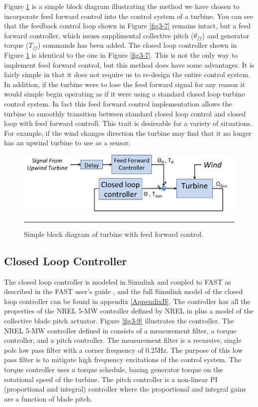 Figure \ref{fig3-8} is a simple block diagram illustrating the method we have chosen  to incorporate feed forward control into the control system of a turbine. You can see that the feedback control loop shown in Figure \ref{fig3-7} remains intact, but a feed forward controller, which issues supplimental collective pitch ($\theta_{ff}$) and generator torque ($T_{ff}$) commands has been added. The closed loop controller shown in Figure \ref{fig3-8} is identical to the one in Figure \ref{fig3-7}. This is not the only way to implement feed forward control, but this method does have some advantages. It is fairly simple in that it does not require us to re-design the entire control system. In addition, if the turbine were to lose the feed forward signal for any reason it would simple begin operating as if it were using a standard closed loop turbine control system. In fact this feed forward control implementation allows the turbine to smoothly transition between standard closed loop control and closed loop with feed forward controll. This trait is desireable for a variety of situations. For example, if the wind changes direction the turbine may find that it no longer has an upwind turbine to use as a sensor.

 \begin{figure}[htbp]
	\centering
		\includegraphics[width=\linewidth]{Figures/ch3Figures/fig3-8.png}
		\rule{35em}{0.5pt}
	\caption{Simple block diagram of turbine with feed forward control.}
	\label{fig3-8}
\end{figure}

\subsection{Closed Loop Controller}

The closed loop controller is modeled in Simulink and coupled to FAST as described in the FAST user's guide \cite{jonkman2005}, and the full Simulink model of the closed loop controller can be found in appendix \ref{AppendixB}. The controller has all the properties of the NREL 5-MW controller defined by NREL in \cite{jonkman2009} plus a model of the collective blade pitch actuator.  Figure \ref{fig3-9} illustrates the controller. The NREL 5-MW controller defined in \cite{jonkman2009} consists of a measurement filter, a torque controller, and a pitch controller. The measurement filter is a recursive, single pole low pass filter with a corner frequency of 0.25Hz. The purpose of this low pass filter is to mitigate high frequency excitations of the control system. The torque controller uses a torque schedule, basing generator torque on the rotational speed of the turbine. The pitch controller is a non-linear PI (proportional and integral) controller where the proportional and integral gains are a function of blade pitch. 

